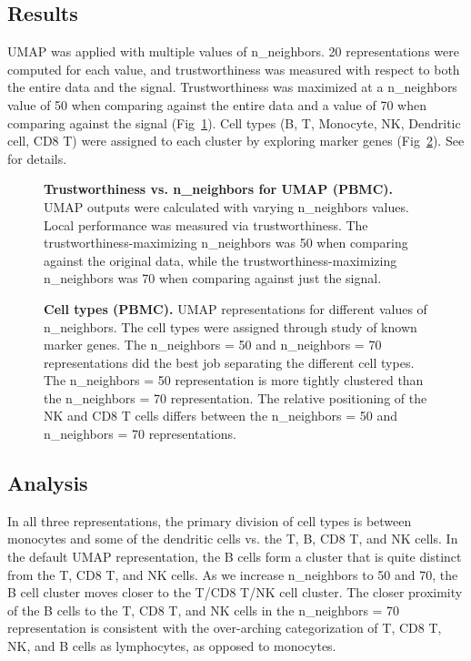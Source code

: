 \documentclass[10pt,letterpaper]{article}
\begin{document}
\subsection*{Results}
UMAP was applied with multiple values of n\_neighbors. 20 representations were computed for each value, and trustworthiness was measured with respect to both the entire data and the signal. Trustworthiness was maximized at a n\_neighbors value of 50 when comparing against the entire data and a value of 70 when comparing against the signal (Fig~\ref{fig16}). Cell types (B, T, Monocyte, NK, Dendritic cell, CD8 T) were assigned to each cluster by exploring marker genes (Fig~\ref{fig17}). See \cite{BPCells tutorial} for details.

\begin{figure}[!h]
\centering
\caption{{\bf Trustworthiness vs. n\_neighbors for UMAP (PBMC).}
UMAP outputs were calculated with varying n\_neighbors values. Local performance was measured via trustworthiness. The trustworthiness-maximizing n\_neighbors was 50 when comparing against the original data, while the trustworthiness-maximizing n\_neighbors was 70 when comparing against just the signal.}
\label{fig16}
\end{figure}

\begin{figure}[!h]
\caption{{\bf Cell types (PBMC).}
UMAP representations for different values of n\_neighbors. The cell types were assigned through study of known marker genes. The n\_neighbors = 50 and n\_neighbors = 70 representations did the best job separating the different cell types. The n\_neighbors = 50 representation is more tightly clustered than the n\_neighbors = 70 representation. The relative positioning of the NK and CD8 T cells differs between the n\_neighbors = 50 and n\_neighbors = 70 representations.}
\label{fig17}
\end{figure}

\subsection*{Analysis}
In all three representations, the primary division of cell types is between monocytes and some of the dendritic cells vs. the T, B, CD8 T, and NK cells. In the default UMAP representation, the B cells form a cluster that is quite distinct from the T, CD8 T, and NK cells. As we increase n\_neighbors to 50 and 70, the B cell cluster moves closer to the T/CD8 T/NK cell cluster. The closer proximity of the B cells to the T, CD8 T, and NK cells in the n\_neighbors = 70 representation is consistent with the over-arching categorization of T, CD8 T, NK, and B cells as lymphocytes, as opposed to monocytes.
\end{document}
